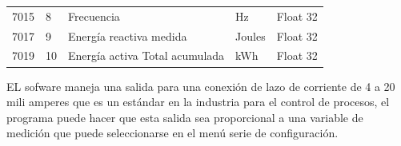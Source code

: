 \begin{table}[h]
\begin{tabular}{@{}lllll@{}}
7015                                                                 & 8                                                                 & Frecuencia                     & Hz       & Float 32     \\
7017                                                                 & 9                                                                 & Energía reactiva medida        & Joules   & Float 32     \\
7019                                                                 & 10                                                                & Energía activa Total acumulada & kWh      & Float 32    
\end{tabular}
\label{registrosmodbs}
\end{table}

EL sofware  maneja una salida para una conexión de lazo de corriente de 4 a 20 mili amperes que es un estándar en la industria para el control de procesos,  el programa puede hacer que esta salida sea proporcional a una variable de medición que puede seleccionarse en el menú serie de configuración.
